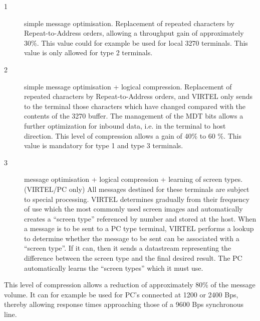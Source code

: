 \documentclass[letterpaper,10pt,english]{sphinxmanual}
\begin{document}
\begin{description}
\begin{description}
\item[{1}] \leavevmode
simple message optimisation.
Replacement of repeated characters by Repeat-to-Address orders, allowing a throughput gain of approximately 30\%. This value could for example be used for local 3270 terminals.
This value is only allowed for type 2 terminals.

\item[{2}] \leavevmode
simple message optimisation + logical compression.
Replacement of repeated characters by Repeat-to-Address orders, and VIRTEL only sends to the terminal those characters which have changed compared with the contents of the 3270 buffer. The management of the MDT bits allows a further
optimization for inbound data, i.e. in the terminal to host direction. This level of compression allows a gain of 40\% to 60 \%. This value is mandatory for type 1 and type 3 terminals.

\item[{3}] \leavevmode
message optimisation + logical compression + learning of screen types. (VIRTEL/PC only)
All messages destined for these terminals are subject to special processing. VIRTEL determines gradually from their frequency of use which the most commonly used screen images and automatically creates a “screen type” referenced by number and stored at the host. When a message is to be sent to a PC type terminal, VIRTEL performs a lookup to determine whether the message to be sent can be associated with a “screen type”. If it can, then it sends a datastream representing the difference between the screen type and the final desired result. The PC automatically learns the “screen types” which it must use.

\end{description}

This level of compression allows a reduction of approximately 80\% of the message volume. It can for example be used for PC’s connected at 1200 or 2400 Bps, thereby allowing response times approaching those of a 9600 Bps synchronous line.

\end{description}
\end{document}
